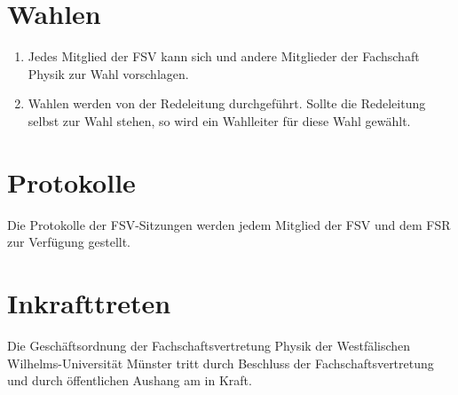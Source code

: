\section{Wahlen}
\begin{enumerate}
	\item Jedes Mitglied der FSV kann sich und andere Mitglieder der Fachschaft Physik zur Wahl vorschlagen.
	\item Wahlen werden von der Redeleitung durchgeführt.
	Sollte die Redeleitung selbst zur Wahl stehen, so wird ein Wahlleiter für diese Wahl gewählt.
\end{enumerate}

\section{Protokolle}
Die Protokolle der FSV-Sitzungen werden jedem Mitglied der FSV und dem FSR zur Verfügung gestellt.


\section{Inkrafttreten}
Die Geschäftsordnung der Fachschaftsvertretung Physik der Westfälischen Wilhelms-Universität Münster tritt durch Beschluss der Fachschaftsvertretung und durch öffentlichen Aushang am  in Kraft.


